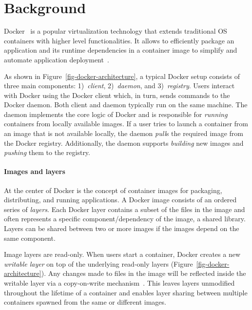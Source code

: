 \section{Background}
\label{sec:background}

Docker~\cite{docker} is a popular virtualization technology
that extends traditional OS containers with higher level
functionalities.
%
It allows to efficiently package an application and its runtime dependencies
in a container image to simplify and automate application deployment~\cite{slacker}.
%
%

%
As shown in Figure~\ref{fig-docker-architecture}, a typical
Docker setup consists of three main components: 1)~\emph{client},
2)~\emph{daemon}, and 3)~\emph{registry}.
%
Users interact with Docker using the Docker client which, in turn,
sends commands to the Docker daemon.
%
Both client and daemon typically run on the same machine.
%
The daemon implements the core logic of Docker and
is responsible for \emph{running} containers from locally available
images.
%
If a user tries to launch a container from an image that is not available
locally, the daemon \emph{pull}s the required image from the Docker registry.
%
Additionally, the daemon supports \emph{building} new images and \emph{pushing}
them to the registry.

\paragraph{Images and layers}
%
At the center of Docker is the concept of container images for packaging,
distributing, and running applications.
%
A Docker image consists of an ordered series of \emph{layers}.
%
Each Docker layer contains a subset of the files in the image and often represents a
specific component/dependency of the image, \eg a shared library.
%
Layers can be shared between two or more images if
the images depend on the same component.

Image layers are read-only.
%
When users start a container, Docker creates a new
\emph{writable layer} on top of the underlying read-only layers
(Figure~\ref{fig-docker-architecture}).
%
Any changes made to files in the image will be reflected inside the writable
layer via a copy-on-write mechanism~\cite{docker-driver-eval}.
%
This leaves layers unmodified throughout the lifetime of a container and
enables layer sharing between multiple containers spawned from the same or
different images.
%
%

